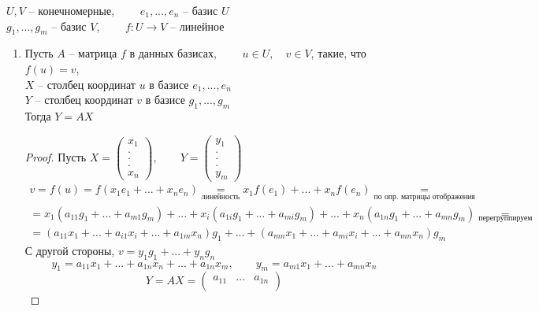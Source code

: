 \begin{lemma}
	$ U, V $ -- конечномерные, $ \qquad e_1, ..., e_n $ -- базис $ U $ \\
	$ g_1, ..., g_m $ -- базис $ V $, $ \qquad f : U \to V $ -- линейное
    \begin{enumerate}
    	\item Пусть $ A $ -- матрица $ f $ в данных базисах, $ \qquad u \in U, \quad v \in V $, такие, что $ f(u) = v $, \\
        $ X $ -- столбец координат $ u $ в базисе $ e_1, ..., e_n $ \\
        $ Y $ -- столбец координат $ v $ в базисе $ g_1, ..., g_m $ \\
        Тогда $ Y = AX $
        \begin{proof}
        	Пусть $ X =
            \begin{pmatrix}
            	x_1 \\
                . \\
                . \\
                . \\
                x_n
            \end{pmatrix}, \qquad Y =
            \begin{pmatrix}
            	y_1 \\
                . \\
                . \\
                . \\
                y_m
            \end{pmatrix} $
            \begin{multline*}
				v = f(u) = f(x_1e_1 + ... + x_ne_n) \underset{\text{линейность}}= x_1f(e_1) + ... + x_nf(e_n) \underset{\text{по опр. матрицы отображения}}= \\ = x_1(a_{11}g_1 + ... + a_{m1}g_m) + ... + x_i(a_{1i}g_1 + ... + a_{mi}g_m) + ... + x_n(a_{1n}g_1 + ... + a_{mn}g_m) \underset{\text{перегруппируем}}= \\ = (a_{11}x_1 + ... + a_{i1}x_i + ... + a_{1m}x_n)g_1 + ... + (a_{mn}x_1 + ... + a_{mi}x_i + ... + a_{mn}x_n)g_m
            \end{multline*}
			С другой стороны, $ v = y_1g_1 + ... + y_ng_n $
			$$ y_1 = a_{11}x_1 + ... + a_{1n}x_n + ... + a_{1n}x_m, \qquad y_m = a_{m1}x_1 + ... + a_{mn}x_n $$
            $$ Y = AX =
            \begin{pmatrix}
                a_{11} & ... & a_{1n} \\

\end{pmatrix}$$
\end{proof}
\end{enumerate}
\end{lemma}
